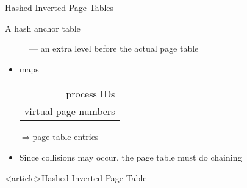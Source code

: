 \begin{frame}{Hashed Inverted Page Tables}
  \begin{description}
  \item[A hash anchor table] --- an extra level before the actual page table 
  \end{description}
  \begin{itemize}
  \item maps
    \begin{scriptsize}
      \begin{tabular}{r}
        process IDs\\
        virtual page numbers
      \end{tabular}
    \end{scriptsize}
    $\Rightarrow{}$page table entries
  \item Since collisions may occur, the page table must do chaining
  \end{itemize}
  \centering
\end{frame}

\begin{frame}<article>{Hashed Inverted Page Table}
  \begin{center}
  \end{center}
\end{frame}


